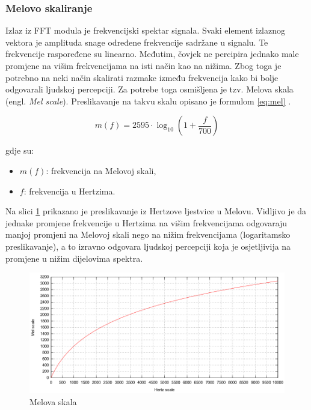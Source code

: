 \subsubsection{Melovo skaliranje}
\label{sec:mel}
Izlaz iz FFT modula je frekvencijski spektar signala.
Svaki element izlaznog vektora je amplituda snage određene frekvencije sadržane u signalu.
Te frekvencije raspoređene su linearno. Međutim, čovjek ne percipira jednako male promjene 
na višim frekvencijama na isti način kao na nižima. Zbog toga je potrebno na neki način skalirati
razmake između frekvencija kako bi bolje odgovarali ljudskoj percepciji. Za potrebe toga
osmišljena je tzv. Melova skala (engl. \textit{Mel scale}). Preslikavanje na takvu skalu opisano je formulom
\eqref{eq:mel} .

\begin{equation}
    m(f) = 2595 \cdot \log_{10}\left(1 + \frac{f}{700}\right)
    \label{eq:mel}
\end{equation}

gdje su:
\begin{itemize}
    \item \(m(f)\): frekvencija na Melovoj skali,
    \item \(f\): frekvencija u Hertzima.
\end{itemize}

Na slici \ref{pic:mel} prikazano je preslikavanje iz Hertzove ljestvice u Melovu. Vidljivo je da
jednake promjene frekvencije u Hertzima na višim frekvencijama odgovaraju manjoj promjeni 
na Melovoj skali nego na nižim frekvencijama (logaritamsko preslikavanje), a to izravno
odgovara ljudskoj percepciji koja je osjetljivija na promjene u nižim dijelovima spektra.

\begin{figure}[htb]
    \centering
    \includegraphics[width=0.8\linewidth]{Chapters/struktura_sustava/generiranje_znacajki/mel.png} 
    \caption{Melova skala \cite{mel}}
    \label{pic:mel}
\end{figure}

